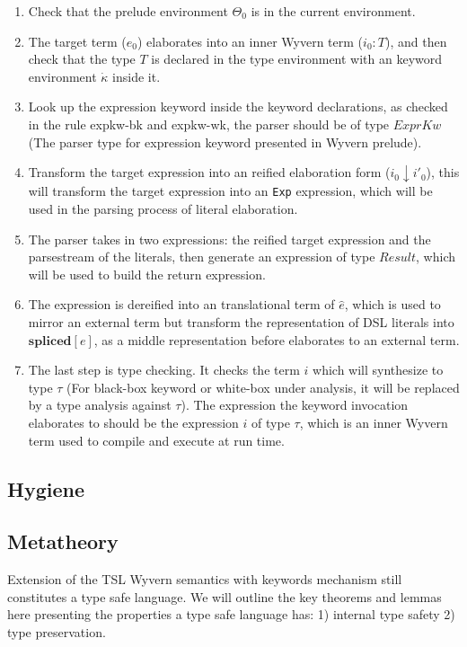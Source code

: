 \documentclass{sig-alternate}
\begin{document}
\begin{enumerate}\setlength{\itemsep}{0pt}
\item Check that the prelude environment $\Theta_0$ is in the current environment. 
\item The target term ($e_0$) elaborates into an inner Wyvern term ($i_0:T$), and then check that the type $T$ is declared in the type environment with an keyword environment $\dot\kappa$ inside it.
\item Look up the expression keyword inside the keyword declarations, as checked in the rule expkw-bk and expkw-wk, the parser should be of type $ExprKw$ (The parser type for expression keyword presented in Wyvern prelude).
\item Transform the target expression into an reified elaboration form ($i_0\downarrow i'_0$), this will transform the target expression into an \verb|Exp| expression, which will be used in the parsing process of literal elaboration.
\item The parser takes in two expressions: the reified target expression and the parsestream of the literals, then generate an expression of type $Result$, which will be used to build the return expression.
\item The expression is dereified into an translational term of $\hat{e}$, which is used to mirror an external term but transform the representation of DSL literals into $\mathbf{spliced}[e]$, as a middle representation before elaborates to an external term.
\item The last step is type checking. It checks the term $i$ which will synthesize to type $\tau$ (For black-box keyword or white-box under analysis, it will be replaced by a type analysis against $\tau$). The expression the keyword invocation elaborates to should be the expression $i$ of type $\tau$, which is an inner Wyvern term used to compile and execute at run time. 
\end{enumerate}


\subsection{Hygiene}

\subsection{Metatheory}
Extension of the TSL Wyvern semantics with keywords mechanism still constitutes a type safe language. We will outline the key theorems and lemmas here presenting the properties a type safe language has: 1) internal type safety 2) type preservation. 
\end{document}
